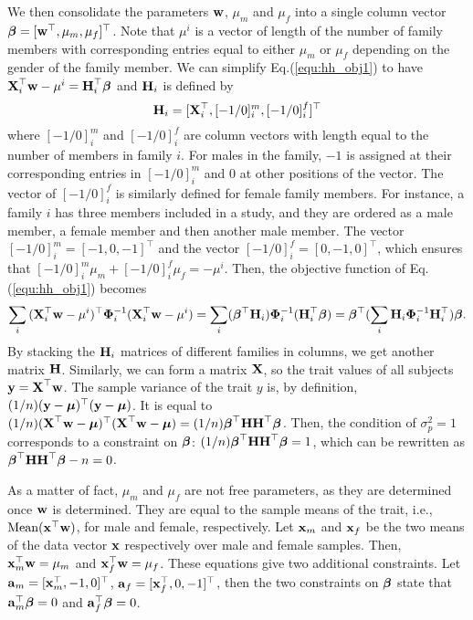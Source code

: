\documentclass[10pt,letterpaper]{article}
\newcommand{\matrx}[1]{\ensuremath\boldsymbol{\rm #1}}
\newcommand{\vect}[1]{\ensuremath\boldsymbol{\rm #1}}
\begin{document}
We then consolidate the parameters $\vect w$, $\mu_m$ and $\mu_f$ into a single column vector $\vect \beta=[\vect w^\top, \mu_m, \mu_f]^\top$. Note that $\mu^i$ is a vector of length of the number of family members with corresponding entries equal to either $\mu_m$ or $\mu_f$ depending on the gender of the family member. We can simplify Eq.(\ref{equ:hh_obj1}) to have $\matrx X_i^\top \vect w -\mu^i = \matrx H_i^\top \vect \beta$ and $\matrx H_i$ is defined by 
\begin{equation*}
\matrx H_i=[\matrx X_i^\top,[-1/0]_{i}^m,[-1/0]_{i}^f]^\top
\end{equation*}
where $[-1/0]_{i}^m$ and $[-1/0]_{i}^f$ are column vectors with length equal to the number of members in family $i$. For males in the family, $-1$ is assigned at their corresponding entries in $[-1/0]_{i}^m$ and $0$ at other positions of the vector. The vector of $[-1/0]_{i}^f$ is similarly defined for female family members. For instance, a family $i$ has three members included in a study, and they are ordered as a male member, a female member and then another male member. The vector $[-1/0]_{i}^m = [-1, 0, -1]^\top$ and the vector $[-1/0]_{i}^f = [0, -1, 0]^\top$, which ensures that $[-1/0]_{i}^m \mu_m + [-1/0]_{i}^f \mu_f = - \mu^{i}$. Then, the objective function of Eq.(\ref{equ:hh_obj1}) becomes
\begin{equation*}\sum_i{(\matrx X_i^\top \vect w -\mu^i)^\top \matrx \Phi_i^{-1} (\matrx X_i^\top \vect w -\mu^i)} = \sum_i (\vect \beta^\top \matrx H_i) \matrx \Phi_i^{-1} (\matrx H_i^\top \vect \beta) = \vect \beta^\top (\sum_i \matrx H_i \matrx \Phi_i^{-1} \matrx H_i^\top ) \vect \beta.
\end{equation*} 
By stacking the $\matrx H_i$ matrices of different families in columns, we get another matrix $\matrx H$. Similarly, we can form a matrix $\matrx X$, so the trait values of all subjects $\vect y=\matrx X ^\top \vect w$. The sample variance of the trait $y$ is, by definition, $(1/n) (\vect y - \vect \mu)^\top (\vect y - \vect \mu)$. It is equal to $(1/n) (\matrx X ^\top \vect w - \vect \mu)^\top(\matrx X ^\top \vect w-\vect \mu) = (1/n)\vect \beta^\top \matrx H \matrx H^\top \vect \beta$. Then, the condition of $\sigma_p^2=1$ corresponds to a constraint on $\vect \beta$: $(1/n)\vect \beta^\top \matrx H \matrx H^\top \vect \beta = 1$, which can be rewritten as $\vect \beta^\top \matrx H \matrx H^\top \vect \beta - n = 0$. 

As a matter of fact, $\mu_m$ and $\mu_f$ are not free parameters, as they are determined once $\vect w$ is determined. They are equal to the sample means of the trait, i.e., $\mbox{Mean}(\vect x^\top \vect w)$, for male and female, respectively. Let $\vect x_m$ and $\vect x_f$ be the two means of the data vector $\vect x$ respectively over male and female samples. Then, $\vect x_m ^\top \vect w = \mu_m$ and $\vect x_f ^\top \vect w = \mu_f$. These equations give two additional constraints.  Let $
\vect a_m=[\vect x_m^\top, -1, 0]^\top$, $\vect a_f=[\vect x_f^\top, 0, -1]^\top$,
then the two constraints on $\vect \beta$ state that $\vect a_m^\top \vect \beta =0$ and $\vect a_f^\top \vect \beta =0$.
\end{document}
